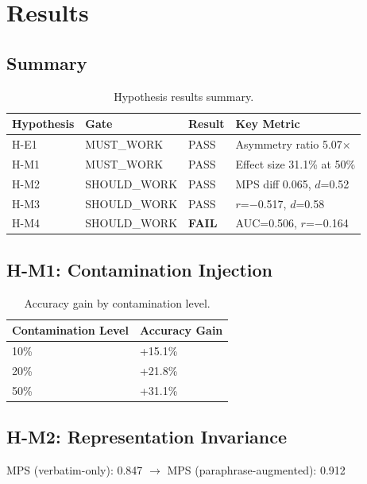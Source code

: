 \section{Results}

\subsection{Summary}

\begin{table}[h]
\centering
\begin{tabular}{llll}
\toprule
Hypothesis & Gate & Result & Key Metric \\
\midrule
H-E1 & MUST\_WORK & PASS & Asymmetry ratio 5.07$\times$ \\
H-M1 & MUST\_WORK & PASS & Effect size 31.1\% at 50\% \\
H-M2 & SHOULD\_WORK & PASS & MPS diff 0.065, $d$=0.52 \\
H-M3 & SHOULD\_WORK & PASS & $r$=$-$0.517, $d$=0.58 \\
H-M4 & SHOULD\_WORK & \textbf{FAIL} & AUC=0.506, $r$=$-$0.164 \\
\bottomrule
\end{tabular}
\caption{Hypothesis results summary.}
\label{tab:results}
\end{table}

\subsection{H-M1: Contamination Injection}

\begin{table}[h]
\centering
\begin{tabular}{ll}
\toprule
Contamination Level & Accuracy Gain \\
\midrule
10\% & +15.1\% \\
20\% & +21.8\% \\
50\% & +31.1\% \\
\bottomrule
\end{tabular}
\caption{Accuracy gain by contamination level.}
\label{tab:accuracy}
\end{table}

\subsection{H-M2: Representation Invariance}

MPS (verbatim-only): 0.847 $\rightarrow$ MPS (paraphrase-augmented): 0.912

